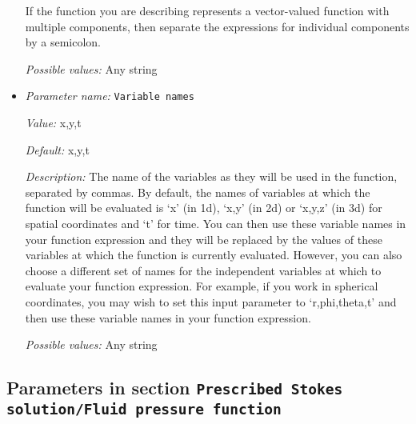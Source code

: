 \begin{itemize}
If the function you are describing represents a vector-valued function with multiple components, then separate the expressions for individual components by a semicolon.


{\it Possible values:} Any string
\item {\it Parameter name:} {\tt Variable names}
\label{parameters:Prescribed Stokes solution/Compaction pressure function/Variable names}


{\it Value:} x,y,t


{\it Default:} x,y,t


{\it Description:} The name of the variables as they will be used in the function, separated by commas. By default, the names of variables at which the function will be evaluated is `x' (in 1d), `x,y' (in 2d) or `x,y,z' (in 3d) for spatial coordinates and `t' for time. You can then use these variable names in your function expression and they will be replaced by the values of these variables at which the function is currently evaluated. However, you can also choose a different set of names for the independent variables at which to evaluate your function expression. For example, if you work in spherical coordinates, you may wish to set this input parameter to `r,phi,theta,t' and then use these variable names in your function expression.


{\it Possible values:} Any string
\end{itemize}

\subsection{Parameters in section \tt Prescribed Stokes solution/Fluid pressure function}
\label{parameters:Prescribed_20Stokes_20solution/Fluid_20pressure_20function}

